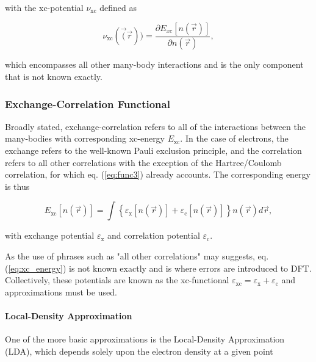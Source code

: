        \noindent with the xc-potential $\nu_\text{xc}$ defined as
        
        \begin{equation}
            \nu_\text{xc}(\vec(\vec{r})) = \frac{\partial E_{xc}[n(\vec{r})]}{\partial n(\vec{r})},
        \end{equation}
        
        \noident which encompasses all other many-body interactions and is the only component that is not known exactly.
        
        \subsubsection{Exchange-Correlation Functional}
        
        Broadly stated, exchange-correlation refers to all of the interactions between the many-bodies with corresponding xc-energy $E_\text{xc}$. In the case of electrons, the exchange refers to the well-known Pauli exclusion principle, and the correlation refers to all other correlations with the exception of the Hartree/Coulomb correlation, for which eq. (\ref{eq:func3}) already accounts. The corresponding energy is thus
        
        \begin{equation}
            \label{eq:xc_energy}
            E_\text{xc}[n(\Vec{r})]= \int \left\{ \varepsilon_\text{x}[n(\Vec{r})] + \varepsilon_\text{c}[n(\Vec{r})]\right\} n(\vec{r})d\vec{r},
        \end{equation}
        
        \noindent with exchange potential $\varepsilon_\text{x}$ and correlation potential $\varepsilon_\text{c}$.
        
        As the use of phrases such as "all other correlations" may suggests, eq. (\ref{eq:xc_energy}) is not known exactly and is where errors are introduced to DFT. Collectively, these potentials are known as the xc-functional $\varepsilon_\text{xc} = \varepsilon_\text{x} + \varepsilon_\text{c}$ and approximations must be used.
        
        \paragraph{Local-Density Approximation} One of the more basic approximations is the Local-Density Approximation (LDA), which depends solely upon the electron density at a given point
        
